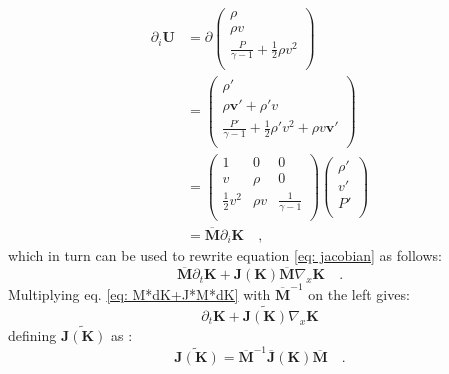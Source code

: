 \documentclass[a4paper]{article}
\begin{document}
\begin{equation}
\begin{split}
	\partial_i \mathbf{U} 
	&= \partial \left(
	\begin{array}{c}
	\rho\\
	\rho v\\
	\frac{P}{\gamma - 1} + \frac{1}{2}\rho v^2\\
	\end{array}
	\right) \\
	&= \left(
	\begin{array}{c}
	\rho'\\
	\rho \mathbf{v'}+\rho' v \\
	\frac{P'}{\gamma - 1} + \frac{1}{2}\rho' v^2+ \rho v\mathbf{v'}\\
	\end{array}
	\right)\\
	&= \left(
	\begin{matrix}
	1 & 0 & 0\\
	v & \rho & 0 \\
	\frac{1}{2} v^2 & \rho v & \frac{1}{\gamma - 1} \\
    \end{matrix}
	\right) \left(\begin{array}{c}
	\rho'\\
	v' \\
	P'\\	
	\end{array}\right)\\
	& = \overline{\textbf{M}} \partial_i \mathbf{K} \quad ,
	\end{split}
\end{equation}
which in turn can be used to rewrite equation \ref{eq: jacobian} as follows:
\begin{equation}\label{eq: M*dK+J*M*dK}
	\overline{\textbf{M}}\partial_t \mathbf{K} + \mathbf{J(K)} \overline{\textbf{M}}\nabla_x \mathbf{K} \quad .
\end{equation}
Multiplying eq. \ref{eq: M*dK+J*M*dK} with $\overline{\textbf{M}}^{-1}$ on the left gives:
\begin{equation}\label{eq: totale vergelijking to solve 1}
\partial_t \mathbf{K} + \widetilde{\mathbf{J(K)}}\nabla_x \mathbf{K}
\end{equation}
defining $\widetilde{\mathbf{J(K)}}$ as :\begin{equation}\label{eq: J-Jtildeverband}
\widetilde{\mathbf{J(K)}} = \overline{\textbf{M}}^{-1} \overline{\textbf{J}}\mathbf{(K)} \overline{\textbf{M}} \quad .
\end{equation}
\end{document}
